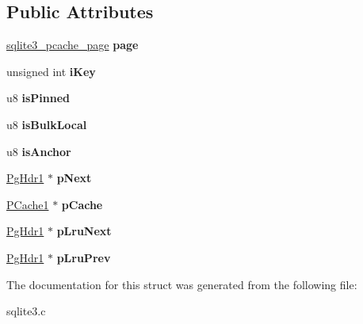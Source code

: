 \subsection*{Public Attributes}
\begin{DoxyCompactItemize}
\item 
\hyperlink{structsqlite3__pcache__page}{sqlite3\+\_\+pcache\+\_\+page} {\bfseries page}\hypertarget{structPgHdr1_a121a9abbfea6b112ba77eeb84391ed47}{}\label{structPgHdr1_a121a9abbfea6b112ba77eeb84391ed47}

\item 
unsigned int {\bfseries i\+Key}\hypertarget{structPgHdr1_ad122ef74f5f0137414882aabd111a01b}{}\label{structPgHdr1_ad122ef74f5f0137414882aabd111a01b}

\item 
u8 {\bfseries is\+Pinned}\hypertarget{structPgHdr1_a361946b03e1d4664476d9ea3fce490d9}{}\label{structPgHdr1_a361946b03e1d4664476d9ea3fce490d9}

\item 
u8 {\bfseries is\+Bulk\+Local}\hypertarget{structPgHdr1_a1c07bb6fab410b7c9f41b24c44a118de}{}\label{structPgHdr1_a1c07bb6fab410b7c9f41b24c44a118de}

\item 
u8 {\bfseries is\+Anchor}\hypertarget{structPgHdr1_a232f677ac68bc8fbb7685e8a1955c810}{}\label{structPgHdr1_a232f677ac68bc8fbb7685e8a1955c810}

\item 
\hyperlink{structPgHdr1}{Pg\+Hdr1} $\ast$ {\bfseries p\+Next}\hypertarget{structPgHdr1_acde43ab0ed0fbba33e526058d9c343b9}{}\label{structPgHdr1_acde43ab0ed0fbba33e526058d9c343b9}

\item 
\hyperlink{structPCache1}{P\+Cache1} $\ast$ {\bfseries p\+Cache}\hypertarget{structPgHdr1_aa5b23de466773e72e1b6edf07b3a4570}{}\label{structPgHdr1_aa5b23de466773e72e1b6edf07b3a4570}

\item 
\hyperlink{structPgHdr1}{Pg\+Hdr1} $\ast$ {\bfseries p\+Lru\+Next}\hypertarget{structPgHdr1_ae22cfc3a39fe029a8f8fdd70e7ca4055}{}\label{structPgHdr1_ae22cfc3a39fe029a8f8fdd70e7ca4055}

\item 
\hyperlink{structPgHdr1}{Pg\+Hdr1} $\ast$ {\bfseries p\+Lru\+Prev}\hypertarget{structPgHdr1_adf220ef63d6ceb782ac87a08aeb1722d}{}\label{structPgHdr1_adf220ef63d6ceb782ac87a08aeb1722d}

\end{DoxyCompactItemize}


The documentation for this struct was generated from the following file\+:\begin{DoxyCompactItemize}
\item 
sqlite3.\+c\end{DoxyCompactItemize}
